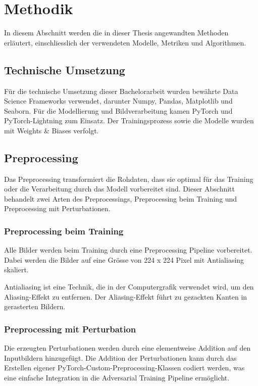 \section{Methodik} 
In diesem Abschnitt werden die in dieser Thesis angewandten Methoden erläutert, einschliesslich der verwendeten Modelle, Metriken und Algorithmen.

\subsection{Technische Umsetzung} \label{chap:technische-umsetzung}
Für die technische Umsetzung dieser Bachelorarbeit wurden bewährte Data Science Frameworks verwendet, darunter Numpy, Pandas, Matplotlib und Seaborn. Für die Modellierung und Bildverarbeitung kamen PyTorch und PyTorch-Lightning zum Einsatz. Der Trainingsprozess sowie die Modelle wurden mit Weights \& Biases verfolgt.

\subsection{Preprocessing}  \label{chap:preprocessing}
Das Preprocessing transformiert die Rohdaten, dass sie optimal für das Training oder die Verarbeitung durch das Modell vorbereitet sind. Dieser Abschnitt behandelt zwei Arten des Preprocessings, Preprocessing beim Training und Preprocessing mit Perturbationen.

\subsubsection{Preprocessing beim Training} \label{chap:Preprocessing beim Training}
Alle Bilder werden beim Training durch eine Preprocessing Pipeline vorbereitet. Dabei werden die Bilder auf eine Grösse von 224 x 224 Pixel mit Antialiasing skaliert.

Antialiasing ist eine Technik, die in der Computergrafik verwendet wird, um den Aliasing-Effekt zu entfernen. Der Aliasing-Effekt führt zu gezackten Kanten in gerasterten Bildern.

\subsubsection{Preprocessing mit Perturbation} \label{chap:Preprocessing mit Perturbation}
Die erzeugten Perturbationen werden durch eine elementweise Addition auf den Inputbildern hinzugefügt. Die Addition der Perturbationen kann durch das Erstellen eigener PyTorch-Custom-Preprocessing-Klassen codiert werden, was eine einfache Integration in die Adversarial Training Pipeline ermöglicht. 
